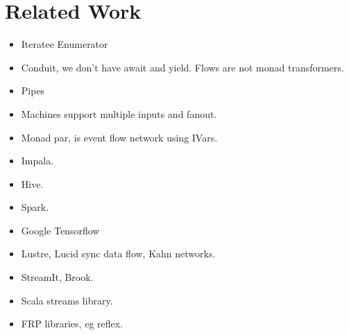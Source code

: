 \section{Related Work}

\begin{itemize}
\item Iteratee Enumerator
\item Conduit, we don't have await and yield. Flows are not monad transformers.
\item Pipes
\item Machines support multiple inputs and fanout.
\item Monad par, is event flow network using IVars.
\item Impala.
\item Hive.
\item Spark.
\item Google Tensorflow
\item Lustre, Lucid sync data flow, Kahn networks.
\item StreamIt, Brook.
\item Scala streams library.
\item FRP libraries, eg reflex.
\end{itemize}


